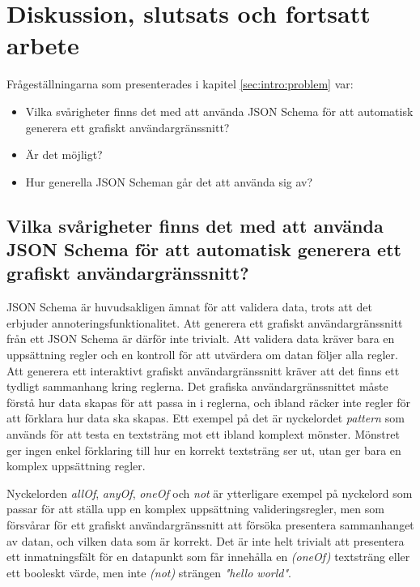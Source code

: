 \chapter{Diskussion, slutsats och fortsatt arbete}
\label{sec:slutsats}


Frågeställningarna som presenterades i kapitel \ref{sec:intro:problem} var:
\begin{itemize}
	\item Vilka svårigheter finns det med att använda JSON Schema för att automatisk generera ett grafiskt
	användargränssnitt?
	\item Är det möjligt?
	\item Hur generella JSON Scheman går det att använda sig av?
\end{itemize}
  
\section{Vilka svårigheter finns det med att använda JSON Schema för att automatisk generera ett grafiskt användargränssnitt?}
\label{sec:slutsats:json-schema}
JSON Schema är huvudsakligen ämnat för att validera data, trots att det erbjuder annoteringsfunktionalitet. Att generera ett grafiskt användargränssnitt från ett JSON Schema är därför inte trivialt. Att validera data kräver bara en uppsättning regler och en kontroll för att utvärdera om datan följer alla regler. Att generera ett interaktivt grafiskt användargränssnitt kräver att det finns ett tydligt sammanhang kring reglerna. Det grafiska användargränssnittet måste förstå hur data skapas för att passa in i reglerna, och ibland räcker inte regler för att förklara hur data ska skapas. Ett exempel på det är nyckelordet \textit{pattern} som används för att testa en textsträng mot ett ibland komplext mönster. Mönstret ger ingen enkel förklaring till hur en korrekt textsträng ser ut, utan ger bara en komplex uppsättning regler.

Nyckelorden \textit{allOf}, \textit{anyOf}, \textit{oneOf} och \textit{not} är ytterligare exempel på nyckelord som passar för att ställa upp en komplex uppsättning valideringsregler, men som försvårar för ett grafiskt användargränssnitt att försöka presentera sammanhanget av datan, och vilken data som är korrekt. Det är inte helt trivialt att presentera ett inmatningsfält för en datapunkt som får innehålla en \textit{(oneOf)} textsträng eller ett booleskt värde, men inte \textit{(not)} strängen \textit{"hello world"}.

